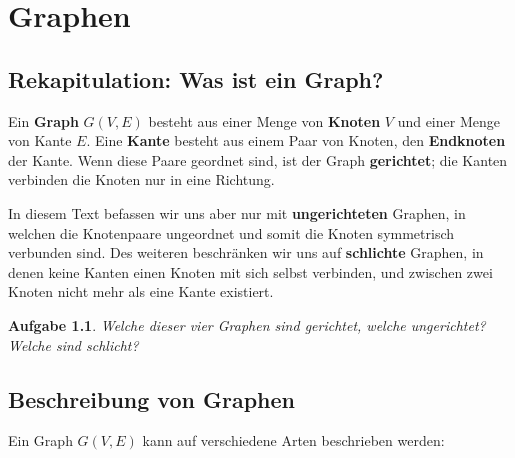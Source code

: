 \documentclass[12pt,a4paper]{report}
\theoremstyle{break}
\newtheorem{exercise}{Aufgabe}[section]
\theoremstyle{plain}
\begin{document}
\chapter{Graphen}
\label{graphs}

\section{Rekapitulation: Was ist ein Graph?}

Ein \textbf{Graph} $G(V,E)$ besteht aus einer Menge von
\textbf{Knoten} $V$ und einer Menge von Kante $E$. Eine \textbf{Kante}
besteht aus einem Paar von Knoten, den \textbf{Endknoten} der
Kante. Wenn diese Paare geordnet sind, ist der Graph
\textbf{gerichtet}; die Kanten verbinden die Knoten nur in eine
Richtung. 

In diesem Text befassen wir uns aber nur mit
\textbf{ungerichteten} Graphen, in welchen die Knotenpaare ungeordnet
und somit die Knoten symmetrisch verbunden sind.  Des weiteren
beschr\"{a}nken wir uns auf \textbf{schlichte} Graphen, in denen keine
Kanten einen Knoten mit sich selbst verbinden, und zwischen zwei
Knoten nicht mehr als eine Kante existiert.

\begin{exercise}
Welche dieser vier Graphen sind gerichtet, welche ungerichtet? Welche
sind schlicht?

\end{exercise}

\section{Beschreibung von Graphen}
\label{Beschreibung}
\noindent Ein Graph $G(V,E)$ kann auf verschiedene Arten beschrieben werden:
\end{document}
